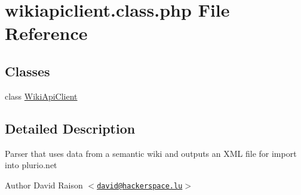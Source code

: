 \hypertarget{wikiapiclient_8class_8php}{
\section{wikiapiclient.class.php File Reference}
\label{wikiapiclient_8class_8php}
}
\subsection*{Classes}
\begin{DoxyCompactItemize}
\item 
class \hyperlink{classWikiApiClient}{WikiApiClient}
\end{DoxyCompactItemize}


\subsection{Detailed Description}
Parser that uses data from a semantic wiki and outputs an XML file for import into plurio.net

\begin{DoxyAuthor}{Author}
David Raison $<$\href{mailto:david@hackerspace.lu}{\tt david@hackerspace.lu}$>$ 
\end{DoxyAuthor}
